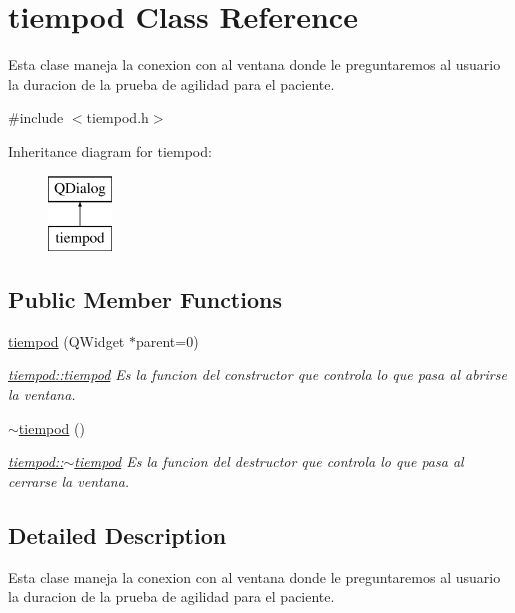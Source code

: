 \hypertarget{classtiempod}{}\section{tiempod Class Reference}
\label{classtiempod}


Esta clase maneja la conexion con al ventana donde le preguntaremos al usuario la duracion de la prueba de agilidad para el paciente.  




{\ttfamily \#include $<$tiempod.\+h$>$}

Inheritance diagram for tiempod\+:\begin{figure}[H]
\begin{center}
\leavevmode
\includegraphics[height=2.000000cm]{classtiempod}
\end{center}
\end{figure}
\subsection*{Public Member Functions}
\begin{DoxyCompactItemize}
\item 
\hyperlink{classtiempod_a0c0071faff0c83839d6bdecdbef92e6e}{tiempod} (Q\+Widget $\ast$parent=0)
\begin{DoxyCompactList}\small\item\em \hyperlink{classtiempod_a0c0071faff0c83839d6bdecdbef92e6e}{tiempod\+::tiempod} Es la funcion del constructor que controla lo que pasa al abrirse la ventana. \end{DoxyCompactList}\item 
\hyperlink{classtiempod_a5107437d6cac97c1b63c3ff9df5a9e36}{$\sim$tiempod} ()
\begin{DoxyCompactList}\small\item\em \hyperlink{classtiempod_a5107437d6cac97c1b63c3ff9df5a9e36}{tiempod\+::$\sim$tiempod} Es la funcion del destructor que controla lo que pasa al cerrarse la ventana. \end{DoxyCompactList}\end{DoxyCompactItemize}


\subsection{Detailed Description}
Esta clase maneja la conexion con al ventana donde le preguntaremos al usuario la duracion de la prueba de agilidad para el paciente. 

